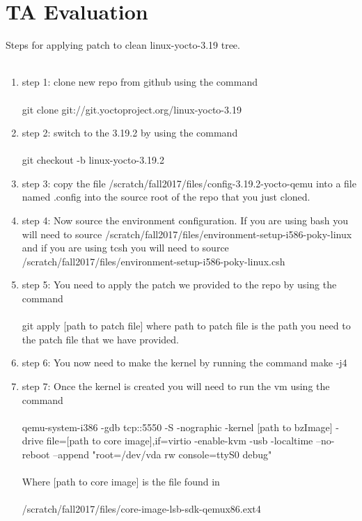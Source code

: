 \documentclass[letterpaper,10pt,titlepage]{article}
\begin{document}
\section{TA Evaluation}
Steps for applying patch to clean linux-yocto-3.19 tree.\\\\
\begin{enumerate}
\item{step 1: }
   clone new repo from github using the command\\\\
   git clone git://git.yoctoproject.org/linux-yocto-3.19
\item{step 2: }
   switch to the 3.19.2 by using the command\\\\
   git checkout -b linux-yocto-3.19.2
\item{step 3: }
   copy the file /scratch/fall2017/files/config-3.19.2-yocto-qemu into a file 
   named .config into the source root of the repo that you just cloned.
\item{step 4: }
   Now source the environment configuration. If you are using bash you will 
   need to source /scratch/fall2017/files/environment-setup-i586-poky-linux 
   and if you are using tcsh you will need  to source 
   /scratch/fall2017/files/environment-setup-i586-poky-linux.csh
\item{step 5: }
   You need to apply the patch we provided to the repo by using the command\\\\
   git apply [path to patch file] where path to patch file is the path you need 
   to the patch file that we have provided.
\item{step 6: }
   You now need to make the kernel by running the command make -j4 
\item{step 7: }
   Once the kernel is created you will need to run the vm using the command\\\\
   qemu-system-i386 -gdb tcp::5550 -S -nographic -kernel [path to bzImage] -drive file=[path to core image],if=virtio -enable-kvm -usb -localtime --no-reboot --append "root=/dev/vda rw console=ttyS0 debug"\\\\
   Where [path to core image] is the file found in\\\\ 
   /scratch/fall2017/files/core-image-lsb-sdk-qemux86.ext4\\\\

\end{enumerate}
\end{document}
